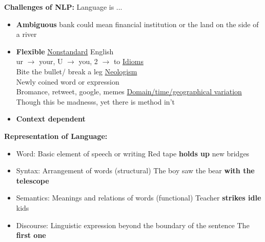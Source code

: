 \documentclass{article}
\begin{document}
\noindent \textbf{Challenges of NLP:} Language is ...
\begin{itemize}
    \item \textbf{Ambiguous}
        \subitem bank could mean financial institution or the land on the side of a river
    \item \textbf{Flexible}
        \subitem \underline{Nonstandard} English\\
        ur $\rightarrow$ your, U $\rightarrow$ you, 2 $\rightarrow$ to
        \subitem \underline{Idioms} \\
        Bite the bullet/ break a leg
        \subitem \underline{Neologism} \\
        Newly coined word or expression \\
        Bromance, retweet, google, memes
        \subitem \underline{Domain/time/geographical variation} \\
        Though this be madnesss, yet there is method in't
    \item \textbf{Context dependent}
\end{itemize}


\noindent \textbf{Representation of Language:} 
\begin{itemize}
    \item Word: Basic element of speech or writing
        \subitem Red tape \textbf{holds up} new bridges
    \item Syntax: Arrangement of words (structural)
        \subitem The boy saw the bear \textbf{with the telescope}
    \item Semantics: Meanings and relations of words (functional)
        \subitem Teacher \textbf{strikes idle} kids
    \item Discourse: Linguistic expression beyond the boundary of the sentence
        \subitem The \textbf{first one}
\end{itemize}
 
\end{document}
